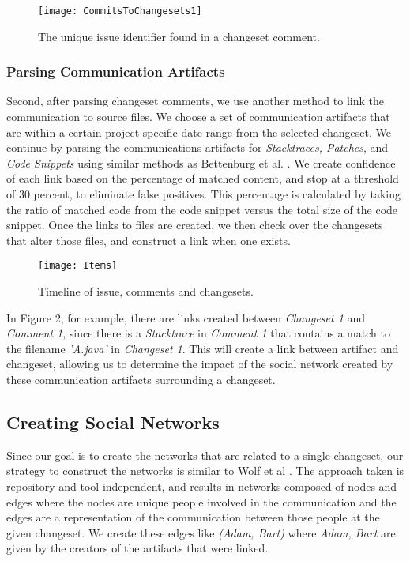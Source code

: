 \documentclass[conference]{IEEEtran}
\begin{document}
\begin{figure}[b!]
\centering
\texttt{[image: CommitsToChangesets1]}
\caption{The unique issue identifier found in a changeset comment.\label{fig:identifier}}
\end{figure}

\subsubsection{Parsing Communication Artifacts}
Second, after parsing changeset comments, we use another method to link the communication to source files.  We choose a set of communication artifacts that are within a certain project-specific date-range from the selected changeset.  We continue by parsing the communications artifacts for \textit{Stacktraces, Patches}, and \textit{Code Snippets} using similar methods as Bettenburg et al. \cite{Bettenburg:2008:ESI:1370750.1370757}.  We create confidence of each link based on the percentage of matched content, and stop at a threshold of 30 percent, to eliminate false positives.  This percentage is calculated by taking the ratio of matched code from the code snippet versus the total size of the code snippet. Once the links to files are created, we then check over the changesets that alter those files, and construct a link when one exists.  

\begin{figure}[t!]
\centering
\texttt{[image: Items]}
\caption{Timeline of issue, comments and changesets.\label{fig:items}}
\end{figure}

In Figure 2, for example, there are links created between \emph{Changeset 1} and \emph{Comment 1}, since there is a \emph{Stacktrace} in \emph{Comment 1} that contains a match to the filename \emph{'A.java'} in \emph{Changeset 1}.  This will create a link between artifact and changeset, allowing us to determine the impact of the social network created by these communication artifacts surrounding a changeset.

\subsection{Creating Social Networks} 
Since our goal is to create the networks that are related to a single changeset, our strategy to construct the networks is similar to Wolf et al \cite{4721184}.  The approach taken is repository and tool-independent, and results in networks composed of nodes and edges where the nodes are unique people involved in the communication and the edges are a representation of the communication between those people at the given changeset.  We create these edges like \emph{(Adam, Bart)} where \emph{Adam, Bart} are given by the creators of the artifacts that were linked.   
\end{document}
